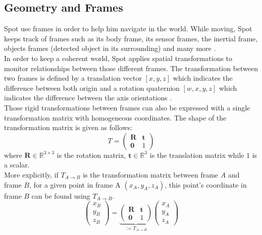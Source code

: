 \subsection{Geometry and Frames}
Spot use frames in order to help him navigate in the world. While moving, Spot keeps track of frames such as its body frame, its sensor frames, the inertial frame, objects frames (detected object in its surrounding) and many more \cite{SpotFrames}. \\

In order to keep a coherent world, Spot applies spatial transformations to monitor relationships between those different frames. The transformation between two frames is defined by a translation vector $[x,y,z]$ which indicates the difference between both origin and a rotation quaternion $[w,x,y,z]$ which indicates the difference between the axis orientations \cite{quaternion}.\\


Those rigid transformations between frames can also be expressed with a single transformation matrix with homogeneous coordinates. The shape of the transformation matrix is given as follows:
\begin{equation}
    T = 
    \begin{pmatrix}
        \textbf{R} & \textbf{t}\\
        \textbf{0} & 1
    \end{pmatrix}
\end{equation}
where $\textbf{R} \in \mathbb{R}^{3 \times 3}$ is the rotation matrix, $\textbf{t} \in \mathbb{R}^3$ is the translation matrix while $1$ is a scalar.\\

More explicitly, if $T_{A\rightarrow B}$ is the transformation matrix between frame $A$ and frame $B$, for a given point in frame A $(x_A, y_A, z_A)$, this point's coordinate in frame $B$ can be found using $T_{A\rightarrow B}$.
\begin{equation}\label{eq:TransfoMatrix}
    \begin{pmatrix}
        x_B \\ y_B \\ z_B
    \end{pmatrix}
    =
    \underbrace{
    \begin{pmatrix}
        \textbf{R} & \textbf{t}\\
        \textbf{0} & 1
    \end{pmatrix}}_\text{$:= T_{A\rightarrow B}$}
    \begin{pmatrix}
        x_A \\ y_A \\ z_A
    \end{pmatrix}
\end{equation}

